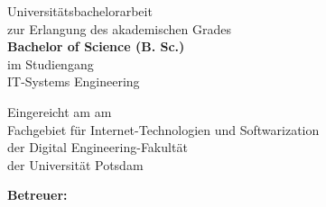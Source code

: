 \begin{titlepage}
    \setcounter{page}{1}
    \centering

    \hspace*{.2\textwidth}

    \vfill
    {\thesistitle\par}\par
    \vspace*{\baselineskip}
    {\thesistitleother\par}\par
    \vspace*{\baselineskip}
    {\smallskip{}\thesisauthor\par}\par

    \vfill
    {
        Universitätsbachelorarbeit\\
        zur Erlangung des akademischen Grades\\
        \textbf{Bachelor of Science (B. Sc.)}\\
        im Studiengang\\
        IT-Systems Engineering\par
    }\par

    \vfill
    {\begin{otherlanguage}{ngerman}
        Eingereicht am \thesishandindate{} am \\
        Fachgebiet für Internet-Technologien und Softwarization\\
        der Digital Engineering-Fakultät\\
        der Universität Potsdam\par
    \end{otherlanguage}}\par

    \vfill
    {\textbf{Betreuer:} \thesisadvisor\par}\par
    \clearpage
\end{titlepage}
